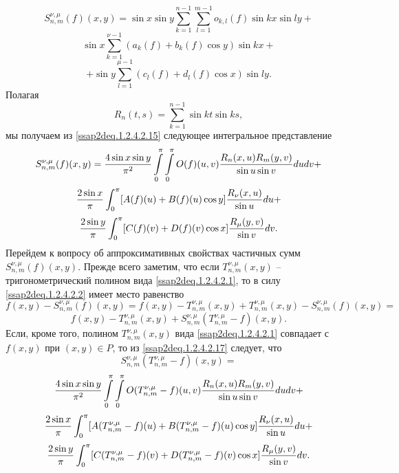 $$
S_{n,m}^{\nu,\mu}(f)(x,y)=  \sin x\sin y\sum_{k=1}^{n-1}\sum_{l=1}^{m-1} o_{k,l}(f)\sin kx\sin ly+
$$
$$
\sin x\sum_{k=1}^{\nu-1} (a_{k}(f)+b_{k}(f)\cos y)\sin kx+
$$
\begin{equation}\label{ssap2deq.1.2.4.2.15}
 +\sin y\sum_{l=1}^{\mu-1} (c_{l}(f)+ d_{l}(f)\cos x)\sin ly.
\end{equation}
Полагая
\begin{equation}\label{ssap2deq.1.2.4.2.16}
R_{n}(t,s)=\sum_{k=1}^{n-1}\sin kt\sin ks,
\end{equation}
мы получаем из   \eqref{ssap2deq.1.2.4.2.15}  следующее интегральное представление
$$
S_{n,m}^{\nu,\mu}(f)(x,y)=  \frac{4\sin x\sin y}{\pi^2}\int\limits_0^\pi\int\limits_0^\pi
 O(f)(u,v){R_{n}(x,u)R_{m}(y,v)\over\sin u\sin v}dudv+
$$
$$
\frac{2\sin x}\pi\int_0^\pi[A(f)(u)+B(f)(u)\cos y]{R_{\nu}(x,u)\over\sin u}du+
$$
\begin{equation}\label{ssap2deq.1.2.4.2.17}
 \frac{2\sin y}\pi\int_0^\pi[C(f)(v)+D(f)(v)\cos x]{R_{\mu}(y,v)\over\sin v}dv.
\end{equation}
Перейдем к вопросу об аппроксимативных свойствах частичных сумм $S_{n,m}^{\nu,\mu}(f)(x,y)$. Прежде всего заметим, что если $T_{n,m}^{\nu,\mu}(x,y)$ -- тригонометрический полином вида \eqref{ssap2deq.1.2.4.2.1}, то в силу \eqref{ssap2deq.1.2.4.2.2} имеет место равенство
$$
f(x,y)-S_{n,m}^{\nu,\mu}(f)(x,y)=f(x,y)-T_{n,m}^{\nu,\mu}(x,y)+T_{n,m}^{\nu,\mu}(x,y)-S_{n,m}^{\nu,\mu}(f)(x,y)=
$$
\begin{equation}\label{ssap2deq.1.2.4.2.18}
f(x,y)-T_{n,m}^{\nu,\mu}(x,y)+S_{n,m}^{\nu,\mu}(T_{n,m}^{\nu,\mu}-f)(x,y).
\end{equation}
Если, кроме того, полином  $T_{n,m}^{\nu,\mu}(x,y)$  вида \eqref{ssap2deq.1.2.4.2.1} совпадает с $f(x,y)$ при $(x,y)\in P$, то из \eqref{ssap2deq.1.2.4.2.17} следует, что
$$
S_{n,m}^{\nu,\mu}(T_{n,m}^{\nu,\mu}-f)(x,y)=
$$
$$
 \frac{4\sin x\sin y}{\pi^2}\int\limits_0^\pi\int\limits_0^\pi
 O(T_{n,m}^{\nu,\mu}-f)(u,v){R_{n}(x,u)R_{m}(y,v)\over\sin u\sin v}dudv+
$$
$$
\frac{2\sin x}\pi\int_0^\pi[A(T_{n,m}^{\nu,\mu}-f)(u)+B(T_{n,m}^{\nu,\mu}-f)(u)\cos y]{R_{\nu}(x,u)\over\sin u}du+
$$
\begin{equation}\label{ssap2deq.1.2.4.2.19}
 \frac{2\sin y}\pi\int_0^\pi[C(T_{n,m}^{\nu,\mu}-f)(v)+D(T_{n,m}^{\nu,\mu}-f)(v)\cos x]{R_{\mu}(y,v)\over\sin v}dv.
\end{equation}

